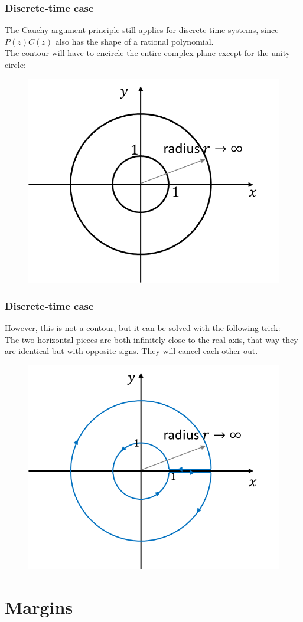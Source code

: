 \begin{frame}
	\frametitle{Discrete-time case}
	The Cauchy argument principle still applies for discrete-time systems, since $P(z)C(z)$ also has the shape of a rational polynomial.\\
	The contour will have to encircle the entire complex plane except for the unity circle:
	\vspace{-4ex}
	\begin{figure}
		\includegraphics[width=0.55\linewidth]{discrete}
	\end{figure}
\end{frame}

\begin{frame}
	\frametitle{Discrete-time case}
	However, this is not a contour, but it can be solved with the following trick:\\
	The two horizontal pieces are both infinitely close to the real axis, that way they are identical but with opposite signs. They will cancel each other out.
	\vspace{-2ex}
	\begin{figure}
		\includegraphics[width=0.5\linewidth]{discrete2}
	\end{figure}
\end{frame}

\section{Margins}

